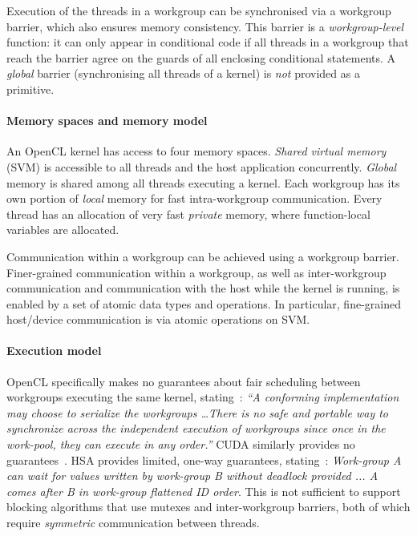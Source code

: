 \documentclass[numbers,nocopyrightspace,10pt]{sigplanconf}
\begin{document}
Execution of the threads in a workgroup can be synchronised via a
workgroup barrier, which also ensures memory consistency.  This
barrier is a \emph{workgroup-level} function: it can only
appear in conditional code if all threads in a workgroup that reach
the barrier agree on the guards of all enclosing conditional
statements.  A \emph{global} barrier
(synchronising all threads of a kernel) is \emph{not} provided as
a primitive.

\paragraph{Memory spaces and memory model}
An OpenCL kernel has access to four memory spaces.  \emph{Shared virtual
memory} (SVM) is accessible to all threads and the host application concurrently.  \emph{Global} memory is shared among all threads executing a
kernel.  Each workgroup has its own portion of \emph{local} memory for fast intra-workgroup communication.  Every thread has
an allocation of very fast \emph{private} memory, where
function-local variables are allocated.

Communication within a workgroup can be achieved
using a workgroup barrier.  Finer-grained
communication within a workgroup, as well as inter-workgroup
communication and communication with the host while the kernel is
running, is enabled by a set of atomic data types and operations.  In
particular, fine-grained host/device communication is via atomic
operations on SVM.

\paragraph{Execution model}

OpenCL specifically makes no guarantees about fair scheduling between
workgroups executing the same kernel, stating~\cite[p.\ 31]{opencl2Spec}: \emph{``A
  conforming implementation may choose to serialize the workgroups 
\dots There is no safe and portable way to synchronize across
  the independent execution of workgroups since once in the work-pool,
  they can execute in any order.''}  CUDA similarly provides no guarantees~\cite{cuda-75}.
%
HSA provides limited, one-way guarantees,
stating~\cite[p. 46]{HSAprogramming11}: \emph{Work-group A can wait
  for values written by work-group B without deadlock provided ... A
  comes after B in work-group flattened ID order}. This is not sufficient to support blocking algorithms that use
mutexes and inter-workgroup barriers, both of which require \emph{symmetric} communication between
threads.
\end{document}
